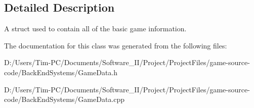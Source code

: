 \subsection{Detailed Description}
A struct used to contain all of the basic game information. 

The documentation for this class was generated from the following files\+:\begin{DoxyCompactItemize}
\item 
D\+:/\+Users/\+Tim-\/\+P\+C/\+Documents/\+Software\+\_\+\+I\+I/\+Project/\+Project\+Files/game-\/source-\/code/\+Back\+End\+Systems/Game\+Data.\+h\item 
D\+:/\+Users/\+Tim-\/\+P\+C/\+Documents/\+Software\+\_\+\+I\+I/\+Project/\+Project\+Files/game-\/source-\/code/\+Back\+End\+Systems/Game\+Data.\+cpp\end{DoxyCompactItemize}
